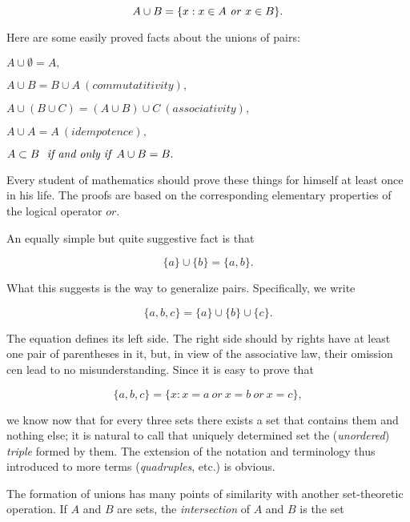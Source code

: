 \begin{equation*}
A \cup B = \{x: x \in A \text{ \textit{or} } x \in B \}.
\end{equation*}

Here are some easily proved facts about the unions of pairs:
\begin{center}
$A \cup \emptyset = A,$

$A \cup B =  B \cup A \: (commutatitivity),$

$A \cup (B \cup C) = (A \cup B) \cup C \: (associativity),$

$A \cup A = A \:(idempotence),$

$ A \subset B \text{ \textit{ if and only if} } A \cup B = B.$
\end{center}

Every student of mathematics should prove these things for himself at least once in his life. The proofs are based on the corresponding elementary properties of the logical operator $or$.

An equally simple but quite suggestive fact is that 

\begin{equation*}
\{ a \} \cup \{ b \} = \{ a, b \}.
\end{equation*}

What this suggests is the way to generalize pairs.   Specifically, we write 

\begin{equation*}
 \{ a, b, c \} = \{ a \} \cup \{ b \} \cup \{ c \}.
\end{equation*}

The equation defines its left side. The right side should by rights have at least one pair of parentheses in it, but, in view of the associative law, their omission cen lead to no misunderstanding. Since it is easy to prove that 

\begin{equation*}
 \{ a, b, c \} = \{ x: x = a \: or \: x = b \: or \: x = c \},
\end{equation*}

we know now that for every three sets there exists a set that contains them and nothing else; it is natural to call that uniquely determined set the (\textit{unordered}) \textit{triple} formed by them. The extension of the notation and terminology thus introduced to more terms (\textit{quadruples}, etc.) is obvious.

The formation of unions has many points of similarity with another set-theoretic operation. If $A$ and $B$ are sets, the \textit{intersection} of $A$ and $B$ is the set 

